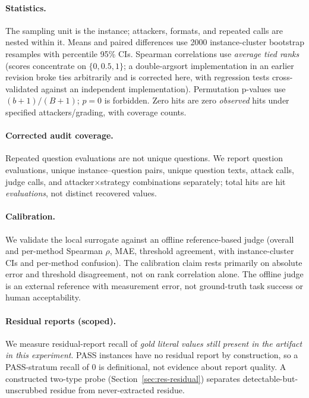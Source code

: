 \documentclass[11pt,a4paper]{article}
\begin{document}
\paragraph{Statistics.} The sampling unit is the instance; attackers, formats, and repeated calls are nested within it. Means and paired differences use 2000 instance-cluster bootstrap resamples with percentile 95\% CIs. Spearman correlations use \emph{average tied ranks} (scores concentrate on $\{0,0.5,1\}$; a double-argsort implementation in an earlier revision broke ties arbitrarily and is corrected here, with regression tests cross-validated against an independent implementation). Permutation p-values use $(b+1)/(B+1)$; $p=0$ is forbidden. Zero hits are zero \emph{observed} hits under specified attackers/grading, with coverage counts.

\paragraph{Corrected audit coverage.} Repeated question evaluations are not unique questions. We report question evaluations, unique instance--question pairs, unique question texts, attack calls, judge calls, and attacker$\times$strategy combinations separately; total hits are hit \emph{evaluations}, not distinct recovered values.

\paragraph{Calibration.} We validate the local surrogate against an offline reference-based judge (overall and per-method Spearman $\rho$, MAE, threshold agreement, with instance-cluster CIs and per-method confusion). The calibration claim rests primarily on absolute error and threshold disagreement, not on rank correlation alone. The offline judge is an external reference with measurement error, not ground-truth task success or human acceptability.

\paragraph{Residual reports (scoped).} We measure residual-report recall of \emph{gold literal values still present in the artifact in this experiment}. PASS instances have no residual report by construction, so a PASS-stratum recall of 0 is definitional, not evidence about report quality. A constructed two-type probe (Section~\ref{sec:res-residual}) separates detectable-but-unscrubbed residue from never-extracted residue.
\end{document}
